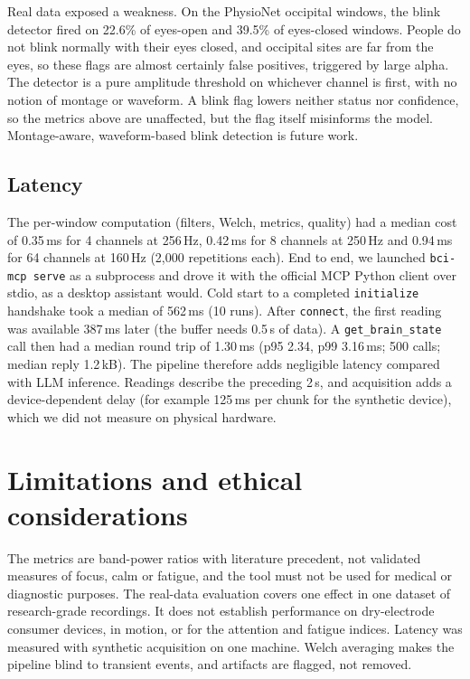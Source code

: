 \documentclass[10pt,twocolumn,letterpaper]{article}
\begin{document}
Real data exposed a weakness. On the PhysioNet occipital windows, the blink
detector fired on 22.6\% of eyes-open and 39.5\% of eyes-closed windows. People do not
blink normally with their eyes closed, and occipital sites are far from the eyes,
so these flags are almost certainly false positives, triggered by large alpha. The detector is a pure
amplitude threshold on whichever channel is first, with no notion of montage or
waveform. A blink flag lowers neither status nor confidence, so the metrics above
are unaffected, but the flag itself misinforms the model. Montage-aware,
waveform-based blink detection is future work.

\subsection{Latency}
The per-window computation (filters, Welch, metrics, quality) had a median cost
of 0.35\,ms for 4 channels at 256\,Hz, 0.42\,ms for 8 channels at 250\,Hz and
0.94\,ms for 64 channels at 160\,Hz (2{,}000 repetitions each). End to end, we
launched \texttt{bci-mcp serve} as a subprocess and drove it with the official
MCP Python client over stdio, as a desktop assistant would. Cold start to a
completed \texttt{initialize} handshake took a median of 562\,ms (10 runs). After
\texttt{connect}, the first reading was available 387\,ms later (the buffer needs
0.5\,s of data). A \texttt{get\_brain\_state} call then had a median round trip
of 1.30\,ms (p95 2.34, p99 3.16\,ms; 500 calls; median reply 1.2\,kB). The
pipeline therefore adds negligible latency compared with LLM inference. Readings
describe the preceding 2\,s, and acquisition adds a device-dependent delay (for
example 125\,ms per chunk for the synthetic device), which we did not measure on
physical hardware.

\section{Limitations and ethical considerations}

The metrics are band-power ratios with literature precedent, not validated
measures of focus, calm or fatigue, and the tool must not be used for medical or
diagnostic purposes. The real-data evaluation covers one effect in one dataset of
research-grade recordings. It does not establish performance on dry-electrode
consumer devices, in motion, or for the attention and fatigue indices. Latency
was measured with synthetic acquisition on one machine. Welch averaging makes
the pipeline blind to transient events, and artifacts are flagged, not removed.
\end{document}

